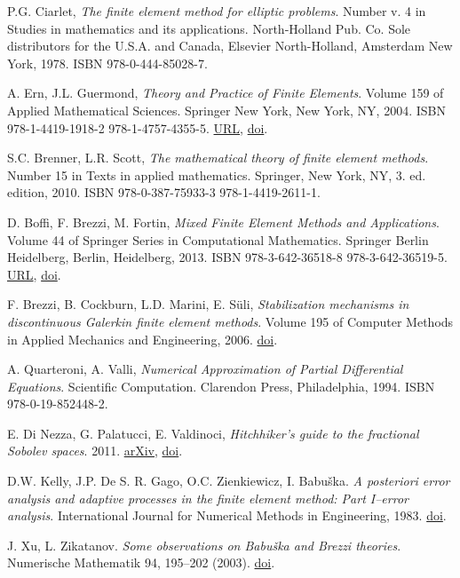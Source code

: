 \documentclass[a4paper, 11pt]{book}
\theoremstyle{plain}
\theoremstyle{definition}
\numberwithin{equation}{chapter}
\numberwithin{figure}{chapter}
\numberwithin{table}{chapter}
\begin{document}
\begin{thebibliography}{9}
P.G. Ciarlet, \emph{The finite element method for elliptic problems}. Number v. 4 in Studies in mathematics and its applications. North-Holland Pub. Co. Sole distributors for the U.S.A. and Canada, Elsevier North-Holland, Amsterdam New York, 1978. ISBN 978-0-444-85028-7.

A. Ern, J.L. Guermond, \emph{Theory and Practice of Finite Elements}. Volume 159 of Applied Mathematical Sciences. Springer New York, New York, NY, 2004. ISBN 978-1-4419-1918-2 978-1-4757-4355-5. \href{http://link.springer.com/10.1007/978-1-4757-4355-5}{URL}, \href{https://doi.org/10.1007/978-1-4757-4355-5}{doi}.

S.C. Brenner, L.R. Scott, \emph{The mathematical theory of finite element methods}. Number 15 in Texts in applied mathematics. Springer, New York, NY, 3. ed. edition, 2010. ISBN 978-0-387-75933-3 978-1-4419-2611-1.

D. Boffi, F. Brezzi, M. Fortin, \emph{Mixed Finite Element Methods and Applications}. Volume 44 of Springer Series in Computational Mathematics. Springer Berlin Heidelberg, Berlin, Heidelberg, 2013. ISBN 978-3-642-36518-8 978-3-642-36519-5. \href{http://link.springer.com/10.1007/978-3-642-36519-5}{URL}, \href{https://doi.org/10.1007/978-3-642-36519-5}{doi}.

F. Brezzi, B. Cockburn, L.D. Marini, E. S\"uli,
\emph{Stabilization mechanisms in discontinuous Galerkin finite element methods}. Volume 195 of Computer Methods in Applied Mechanics and Engineering, 2006. \href{https://doi.org/10.1016/j.cma.2005.06.015}{doi}.

A. Quarteroni, A. Valli, \emph{Numerical Approximation of Partial Differential Equations}. Scientific Computation. Clarendon Press, Philadelphia, 1994. ISBN 978-0-19-852448-2.

E. Di Nezza, G. Palatucci, E. Valdinoci,
\emph{Hitchhiker’s guide to the fractional Sobolev spaces}. 2011.
\href{https://arxiv.org/abs/1104.4345v3}{arXiv}, \href{https://doi.org/10.48550/arXiv.1104.4345}{doi}.

D.W. Kelly, J.P. De S. R. Gago, O.C. Zienkiewicz, I. Babu\v{s}ka. \emph{A posteriori error analysis and adaptive processes in the finite element method: Part I–error analysis}. International Journal for Numerical Methods in Engineering, 1983. \href{https://doi.org/10.1002/nme.1620191103}{doi}.

J. Xu, L. Zikatanov. \emph{Some observations on Babu\v{s}ka and Brezzi theories}. Numerische Mathematik 94, 195–202 (2003).
\href{https://doi.org/10.1007/s002110100308}{doi}.
\end{thebibliography}
\end{document}
